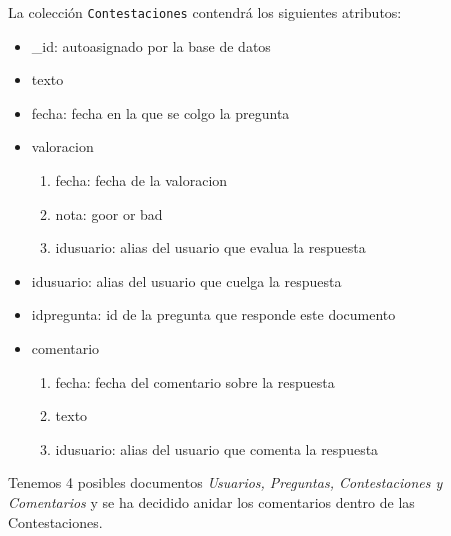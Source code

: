 \documentclass{article}
\begin{document}
    \par
    La colección \texttt{Contestaciones} contendrá los siguientes atributos:   
    \begin{itemize}  
        \item _id: autoasignado por la base de datos 
        \item texto
        \item fecha: fecha en la que se colgo la pregunta
        \item valoracion
        \begin{enumerate}
          \item fecha: fecha de la valoracion
          \item nota: goor or bad
          \item idusuario: alias del usuario que evalua la respuesta
        \end{enumerate}
        \item idusuario: alias del usuario que cuelga la respuesta
        \item idpregunta: id de la pregunta que responde este documento
        \item comentario
        \begin{enumerate}
          \item fecha: fecha del comentario sobre la respuesta
          \item texto
          \item idusuario: alias del usuario que comenta la respuesta
        \end{enumerate}
    \end{itemize}
    \par
    Tenemos 4 posibles documentos \emph{Usuarios, Preguntas, Contestaciones y Comentarios}
    y se ha decidido anidar los comentarios dentro de las Contestaciones. 
\end{document}
